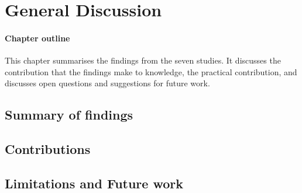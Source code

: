 \chapter{General Discussion}

\begin{mynote}
\subsubsection{Chapter outline}
This chapter summarises the findings from the seven studies. It discusses the contribution that the findings make to knowledge, the practical contribution, and discusses open questions and suggestions for future work.
\end{mynote}

\section{Summary of findings}

\section{Contributions}

\section{Limitations and Future work}